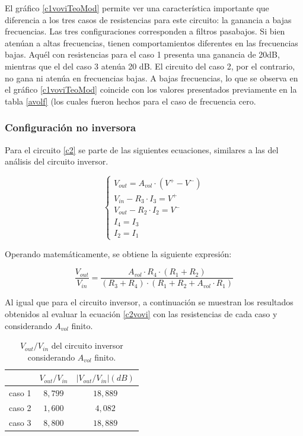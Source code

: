 El gr\'afico \ref{c1voviTeoMod} permite ver una caracter\'istica importante que diferencia a los tres casos de 
resistencias para este circuito: la ganancia a bajas frecuencias. Las tres configuraciones corresponden 
a filtros pasabajos. Si bien aten\'uan a altas frecuencias, 
tienen comportamientos diferentes en las frecuencias bajas. 
Aqu\'el con resistencias para el caso 1 presenta una ganancia de 20dB, 
mientras que el del caso 3 aten\'ua 20 dB. El circuito del caso 2, por el contrario, no gana ni aten\'ua 
en frecuencias bajas. A bajas frecuencias, lo que se observa en el gr\'afico \ref{c1voviTeoMod} coincide con los valores presentados previamente en la tabla \ref{avolf} (los cuales fueron hechos para el caso de frecuencia cero.


\subsubsection*{Configuraci\'on no inversora}

Para el circuito \ref{c2} se parte de las siguientes ecuaciones, similares a las del an\'alisis del circuito inversor. 

\begin{equation}
	\begin{cases}
		V_{out} = A_{vol}\cdot(V^+ - V^-) \\
		V_{in} - R_3 \cdot I_3 = V^+ \\
		V_{out} - R_2 \cdot I_2 = V^- \\
		I_4 = I_3\\
		I_2 = I_1
	\end{cases}
	\label{ecsbase2}
\end{equation}



Operando matem\'aticamente, se obtiene la siguiente expresi\'on:

\begin{equation}
	\frac{V_{out}}{V_{in}} =  \frac{A_{vol} \cdot R_4 \cdot (R_1 + R_2)}{(R_3 + R_4) \cdot (R_1 + R_2 + A_{vol} \cdot R_1)}
	\label{c2vovi}
\end{equation}

Al igual que para el circuito inversor, a continuaci\'on se muestran
los resultados obtenidos al evaluar la ecuaci\'on \ref{c2vovi} con las resistencias
de cada caso y considerando $A_{vol}$ finito.

\begin{table}[h!]
	\centering
	\begin{tabular}{c c c}%
		\bfseries  & $V_{out}/V_{in}$ &  $|V_{out}/V_{in}| (dB)$\\ \hline
		caso 1 & $8,799$ & $18,889$ \\
		caso 2 & $1,600$ & $4,082$\\
		caso 3 & $8,800$ & $18,889$\\
		\hline
	\end{tabular}
	\caption{$V_{out}/V_{in}$ del circuito inversor considerando $A_{vol}$ finito.}
	\label{avolf2}
\end{table}

